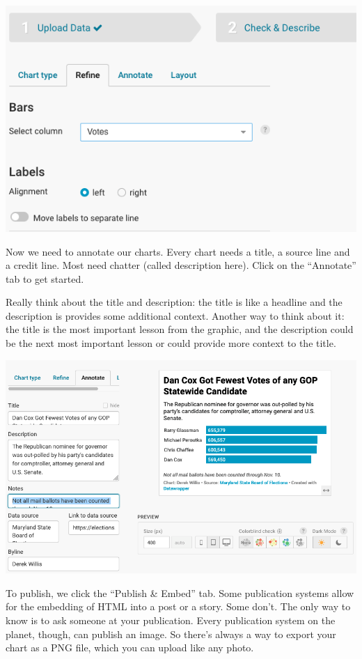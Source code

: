 \documentclass[
  letterpaper,
  DIV=11,
  numbers=noendperiod]{scrreprt}
\begin{document}
\includegraphics{./images/datawrapper4.png}

Now we need to annotate our charts. Every chart needs a title, a source
line and a credit line. Most need chatter (called description here).
Click on the ``Annotate'' tab to get started.

Really think about the title and description: the title is like a
headline and the description is provides some additional context.
Another way to think about it: the title is the most important lesson
from the graphic, and the description could be the next most important
lesson or could provide more context to the title.

\includegraphics{./images/datawrapper5.png}

To publish, we click the ``Publish \& Embed'' tab. Some publication
systems allow for the embedding of HTML into a post or a story. Some
don't. The only way to know is to ask someone at your publication. Every
publication system on the planet, though, can publish an image. So
there's always a way to export your chart as a PNG file, which you can
upload like any photo.
\end{document}
